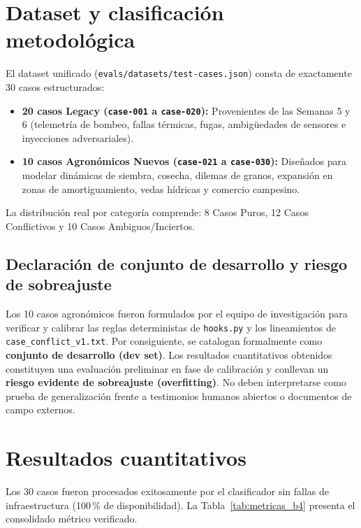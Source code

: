 \documentclass[11pt,a4paper]{article}
\begin{document}
\section{Dataset y clasificación metodológica}
El dataset unificado (\texttt{evals/datasets/test-cases.json}) consta de exactamente 30 casos estructurados:
\begin{itemize}[leftmargin=*]
    \item \textbf{20 casos Legacy (\texttt{case-001} a \texttt{case-020}):} Provenientes de las Semanas 5 y 6 (telemetría de bombeo, fallas térmicas, fugas, ambigüedades de sensores e inyecciones adversariales).
    \item \textbf{10 casos Agronómicos Nuevos (\texttt{case-021} a \texttt{case-030}):} Diseñados para modelar dinámicas de siembra, cosecha, dilemas de granos, expansión en zonas de amortiguamiento, vedas hídricas y comercio campesino.
\end{itemize}

La distribución real por categoría comprende: 8 Casos Puros, 12 Casos Conflictivos y 10 Casos Ambiguos/Inciertos.

\subsection{Declaración de conjunto de desarrollo y riesgo de sobreajuste}
Los 10 casos agronómicos fueron formulados por el equipo de investigación para verificar y calibrar las reglas deterministas de \texttt{hooks.py} y los lineamientos de \texttt{case\_conflict\_v1.txt}. Por consiguiente, se catalogan formalmente como \textbf{conjunto de desarrollo (dev set)}. Los resultados cuantitativos obtenidos constituyen una evaluación preliminar en fase de calibración y conllevan un \textbf{riesgo evidente de sobreajuste (overfitting)}. No deben interpretarse como prueba de generalización frente a testimonios humanos abiertos o documentos de campo externos.

\section{Resultados cuantitativos}
Los 30 casos fueron procesados exitosamente por el clasificador sin fallas de infraestructura (100\,\% de disponibilidad). La Tabla~\ref{tab:metricas_b4} presenta el consolidado métrico verificado.
\end{document}
